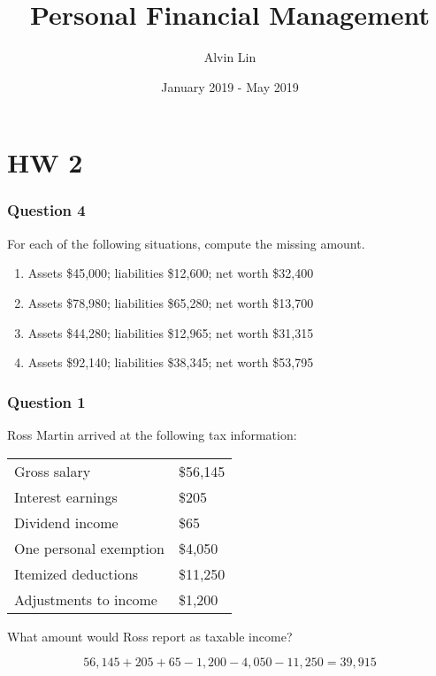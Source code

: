 \documentclass{math}
\title{Personal Financial Management}
\author{Alvin Lin}
\date{January 2019 - May 2019}
\begin{document}
\maketitle

\section*{HW 2}

\subsubsection*{Question 4}
For each of the following situations, compute the missing amount.
\begin{enumerate}
  \item Assets \$45,000; liabilities \$12,600; net worth \$32,400
  \item Assets \$78,980; liabilities \$65,280; net worth \$13,700
  \item Assets \$44,280; liabilities \$12,965; net worth \$31,315
  \item Assets \$92,140; liabilities \$38,345; net worth \$53,795
\end{enumerate}

\subsubsection*{Question 1}
Ross Martin arrived at the following tax information: \\
\begin{center}
  \begin{tabular}{ll}
    Gross salary & \$56,145 \\
    Interest earnings & \$205 \\
    Dividend income & \$65 \\
    One personal exemption & \$4,050 \\
    Itemized deductions & \$11,250 \\
    Adjustments to income & \$1,200
  \end{tabular}
\end{center}
What amount would Ross report as taxable income? \par
\[ 56,145+205+65-1,200-4,050-11,250 = 39,915 \]
\end{document}
